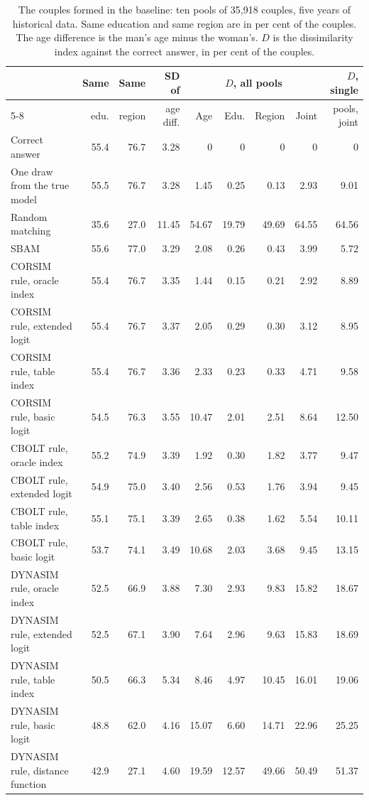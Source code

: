 \documentclass[12pt,a4paper]{article}
\begin{document}
\begin{table}[H]
\centering
\caption{The couples formed in the baseline: ten pools of 35,918 couples, five years of
historical data. Same education and same region are in per cent of the couples. The age
difference is the man's age minus the woman's. $D$ is the dissimilarity index against the correct
answer, in per cent of the couples.}
\label{tab:baseline}
\small
\setlength{\tabcolsep}{4pt}
\begin{tabular}{@{}l rrr rrrr r@{}}
\toprule
 & Same & Same & SD of & \multicolumn{4}{c}{$D$, all pools} & $D$, single \\
\cmidrule(lr){5-8}
 & edu. & region & age diff. & Age & Edu. & Region & Joint & pools, joint \\
\midrule
Correct answer & 55.4 & 76.7 & 3.28 & 0 & 0 & 0 & 0 & 0 \\
One draw from the true model & 55.5 & 76.7 & 3.28 & 1.45 & 0.25 & 0.13 & 2.93 & 9.01 \\
Random matching & 35.6 & 27.0 & 11.45 & 54.67 & 19.79 & 49.69 & 64.55 & 64.56 \\
\addlinespace
SBAM & 55.6 & 77.0 & 3.29 & 2.08 & 0.26 & 0.43 & 3.99 & 5.72 \\
\addlinespace
CORSIM rule, oracle index & 55.4 & 76.7 & 3.35 & 1.44 & 0.15 & 0.21 & 2.92 & 8.89 \\
CORSIM rule, extended logit & 55.4 & 76.7 & 3.37 & 2.05 & 0.29 & 0.30 & 3.12 & 8.95 \\
CORSIM rule, table index & 55.4 & 76.7 & 3.36 & 2.33 & 0.23 & 0.33 & 4.71 & 9.58 \\
CORSIM rule, basic logit & 54.5 & 76.3 & 3.55 & 10.47 & 2.01 & 2.51 & 8.64 & 12.50 \\
\addlinespace
CBOLT rule, oracle index & 55.2 & 74.9 & 3.39 & 1.92 & 0.30 & 1.82 & 3.77 & 9.47 \\
CBOLT rule, extended logit & 54.9 & 75.0 & 3.40 & 2.56 & 0.53 & 1.76 & 3.94 & 9.45 \\
CBOLT rule, table index & 55.1 & 75.1 & 3.39 & 2.65 & 0.38 & 1.62 & 5.54 & 10.11 \\
CBOLT rule, basic logit & 53.7 & 74.1 & 3.49 & 10.68 & 2.03 & 3.68 & 9.45 & 13.15 \\
\addlinespace
DYNASIM rule, oracle index & 52.5 & 66.9 & 3.88 & 7.30 & 2.93 & 9.83 & 15.82 & 18.67 \\
DYNASIM rule, extended logit & 52.5 & 67.1 & 3.90 & 7.64 & 2.96 & 9.63 & 15.83 & 18.69 \\
DYNASIM rule, table index & 50.5 & 66.3 & 5.34 & 8.46 & 4.97 & 10.45 & 16.01 & 19.06 \\
DYNASIM rule, basic logit & 48.8 & 62.0 & 4.16 & 15.07 & 6.60 & 14.71 & 22.96 & 25.25 \\
DYNASIM rule, distance function & 42.9 & 27.1 & 4.60 & 19.59 & 12.57 & 49.66 & 50.49 & 51.37 \\
\bottomrule
\end{tabular}
\end{table}
\end{document}
